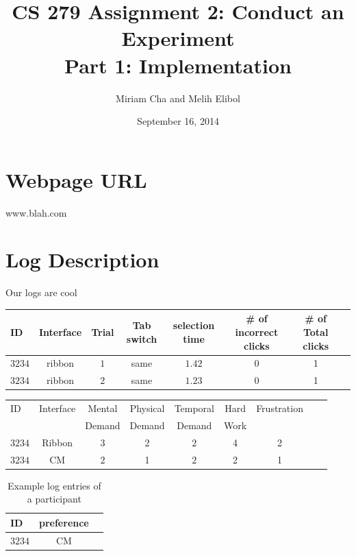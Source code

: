 \documentclass{article}
\title{CS 279 Assignment 2: Conduct an Experiment\\Part 1: Implementation}
\author{Miriam Cha and Melih Elibol}
\date{September 16, 2014}
\begin{document}
\maketitle

\section*{Webpage URL}
 www.blah.com
\section*{Log Description} 
 Our logs are cool
 
\begin{table}[tbh]
  \centering
\begin{tabular}{|l|c|c|c|c|c|c|c|}
  \hline
 ID &  Interface  &  Trial &  Tab switch & selection time & \# of incorrect clicks & \# of Total clicks              \\\hline
 $3234$ &   ribbon  & $1$  & same  & $1.42$ & 0  &1 \\ \hline
$3234$  &    ribbon &   $2$ & same  & $1.23$ & 0 &1  \\\hline       
\end{tabular}
\end{table}

\begin{table}[tbh]
  \centering
\begin{tabular}{|l|c|c|c|c|c|c|c|c|}
  \hline
  ID &  Interface  & Mental 	&  Physical 	 &Temporal  	& Hard  & Frustration      \\      
       &                  & Demand	& Demand 	& Demand 	& Work		     &			\\\hline
$3234$ &   Ribbon  & $3$  & 2  & $2$ & 4  &2  \\ \hline
$3234$  &    CM &   $2$ & 1  & $2$ & 2 &1  \\\hline       
\end{tabular}
\end{table}

\begin{table}[tbh]
  \centering
\begin{tabular}{|l|c|c|}
  \hline
    ID               & preference                \\\hline
 $3234$ &   CM      \\ \hline
\end{tabular}
\caption{Example log entries of a participant}
\end{table}
\end{document}
